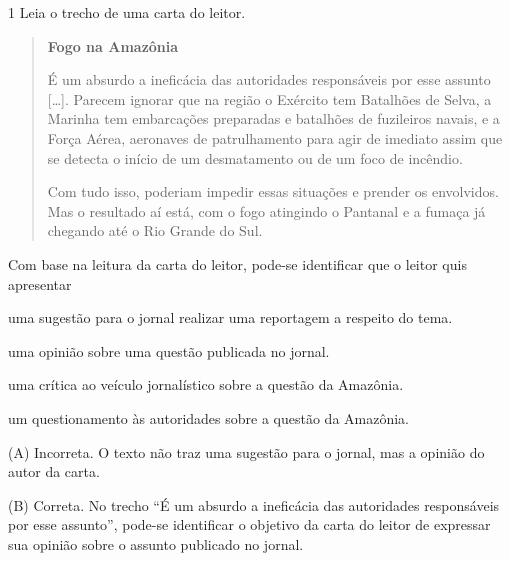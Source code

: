 \begin{escolha}
\begin{escolha}
{\begin{escolha}

\num{1} Leia o trecho de uma carta do leitor.

\begin{quote}
\textbf{Fogo na Amazônia}

É um absurdo a ineficácia das autoridades responsáveis por esse assunto
{[}\ldots{}{]}. Parecem ignorar que na região o Exército tem Batalhões
de Selva, a Marinha tem embarcações preparadas e batalhões de fuzileiros
navais, e a Força Aérea, aeronaves de patrulhamento para agir de
imediato assim que se detecta o início de um desmatamento ou de um foco
de incêndio.

Com tudo isso, poderiam impedir essas situações e prender os envolvidos.
Mas o resultado aí está, com o fogo atingindo o Pantanal e a fumaça já
chegando até o Rio Grande do Sul.

\end{quote}

Com base na leitura da carta do leitor, pode-se identificar que o leitor
quis apresentar

\begin{escolha}
\item uma sugestão para o jornal realizar uma reportagem a respeito do tema.

\item uma opinião sobre uma questão publicada no jornal.

\item uma crítica ao veículo jornalístico sobre a questão da Amazônia.

\item um questionamento às autoridades sobre a questão da Amazônia.
\end{escolha}


(A) Incorreta. O texto não traz uma sugestão para o jornal, mas a
opinião do autor da carta.

(B) Correta. No trecho ``É um absurdo a ineficácia das autoridades
responsáveis por esse assunto'', pode-se identificar o objetivo da carta
do leitor de expressar sua opinião sobre o assunto publicado no jornal.


\end{escolha}}
\end{escolha}
\end{escolha}
